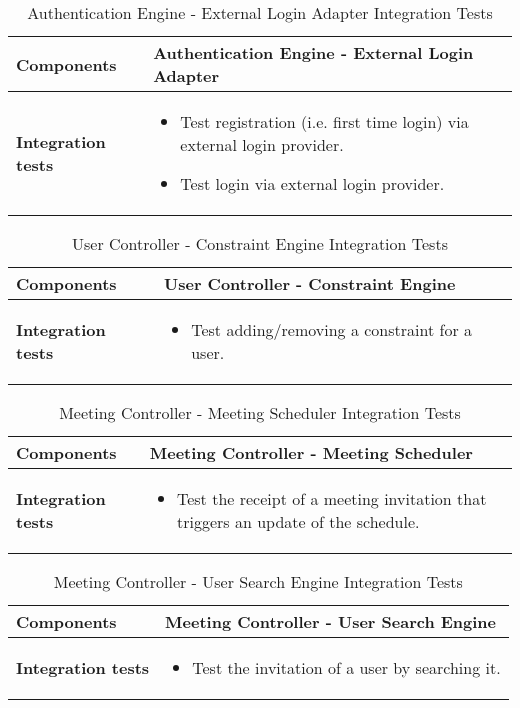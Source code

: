 \begin{table}[H]	
	\centering
	\def\arraystretch{1.5}
	\begin{tabular}{|m{4cm}|m{12cm}|}
		\hline
		\textbf{Components} & Authentication Engine - External Login Adapter \\ \hline
		\textbf{Integration tests} &
			\begin{itemize} 
			\item Test registration (i.e. first time login) via external login provider.
			\item Test login via external login provider. 
			\end{itemize} \\ \hline
	\end{tabular}
	\caption{Authentication Engine - External Login Adapter Integration Tests}
\end{table}

\begin{table}[H]	
	\centering
	\def\arraystretch{1.5}
	\begin{tabular}{|m{4cm}|m{12cm}|}
		\hline
		\textbf{Components} & User Controller - Constraint Engine \\ \hline
		\textbf{Integration tests} & 
			\begin{itemize}
			\item Test adding/removing a constraint for a user.
			\end{itemize} \\ \hline
	\end{tabular}
	\caption{User Controller - Constraint Engine Integration Tests}
\end{table}

\begin{table}[H]	
	\centering
	\def\arraystretch{1.5}
	\begin{tabular}{|m{4cm}|m{12cm}|}
		\hline
		\textbf{Components} & Meeting Controller - Meeting Scheduler \\ \hline
		\textbf{Integration tests} & 
			\begin{itemize}
			\item Test the receipt of a meeting invitation that triggers an update of the schedule.
			\end{itemize} \\ \hline
	\end{tabular}
	\caption{Meeting Controller - Meeting Scheduler Integration Tests}
\end{table}

\begin{table}[H]	
	\centering
	\def\arraystretch{1.5}
	\begin{tabular}{|m{4cm}|m{12cm}|}
		\hline
		\textbf{Components} & Meeting Controller - User Search Engine \\ \hline
		\textbf{Integration tests} & 
			\begin{itemize}
			\item Test the invitation of a user by searching it.
			\end{itemize} \\ \hline
	\end{tabular}
	\caption{Meeting Controller - User Search Engine Integration Tests}
\end{table}

